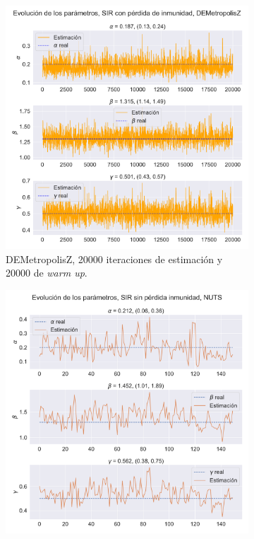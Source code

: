 \begin{figure}[h]
    \centering
    \begin{subfigure}[b]{0.49\linewidth}
        \centering
        \includegraphics[width=\linewidth]{img/content/chapter4/DEMetropolis_sir_rec_params_trace.pdf}
        \caption{DEMetropolisZ, 20000 iteraciones de estimación y 20000 de \textit{warm up}.}
        \label{fig:NUTS_sir_rec_params_trace}
    \end{subfigure}
    \begin{subfigure}[b]{0.49\linewidth}
        \centering
        \includegraphics[width=\linewidth]{img/content/chapter4/NUTS_sir_rec_params_trace.pdf}

\end{subfigure}
\end{figure}
